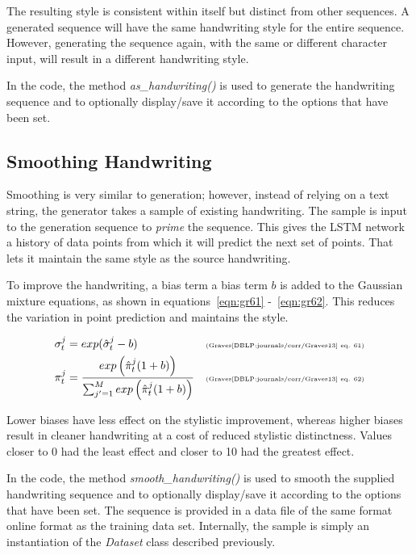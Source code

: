 \documentclass{article}
\begin{document}
The resulting style is consistent within itself but distinct from other sequences. A generated sequence will have the same handwriting style for the entire sequence. However, generating the sequence again, with the same or different character input, will result in a different handwriting style.

In the code, the method \textit{as\_handwriting()} is used to generate the handwriting sequence and to optionally display/save it according to the options that have been set.

\subsection{Smoothing Handwriting}
Smoothing is very similar to generation; however, instead of relying on a text string, the generator takes a sample of existing handwriting. The sample is input to the generation sequence to \textit{prime} the sequence. This gives the LSTM network a history of data points from which it will predict the next set of points. That lets it maintain the same style as the source handwriting.

To improve the handwriting, a bias term a bias term $b$ is added to the Gaussian mixture equations, as shown in equations~\ref{eqn:gr61} -~\ref{eqn:gr62}. This reduces the variation in point prediction and maintains the style.

    \begin{align}
        \label{eqn:gr61} \sigma_t^j &= exp(\hat{\sigma}_t^j-b) & \text{\tiny{(Graves\cite{DBLP:journals/corr/Graves13} eq. 61)}} \\
        \label{eqn:gr62} \pi_t^j &= \frac{exp\left(\hat{\pi}_t^j(1+b)\right)}{\sum_{j'=1}^Mexp\left(\hat{\pi}_t^j(1+b)\right)} & \text{\tiny{(Graves\cite{DBLP:journals/corr/Graves13} eq. 62)}}
    \end{align}  
    
Lower biases have less effect on the stylistic improvement, whereas higher biases result in cleaner handwriting at a cost of reduced stylistic distinctness. Values closer to 0 had the least effect and closer to 10 had the greatest effect.

In the code, the method \textit{smooth\_handwriting()} is used to smooth the supplied handwriting sequence and to optionally display/save it according to the options that have been set. The sequence is provided in a data file of the same format online format as the training data set. Internally, the sample is simply an instantiation of the \textit{Dataset} class described previously.
\end{document}
